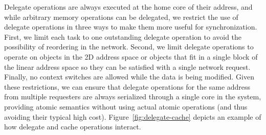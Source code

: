 Delegate operations are always executed at the home core of their
address, and while arbitrary memory operations can be delegated, we
restrict the use of delegate operations in three ways to make them more
useful for synchronization. First, we limit each task to one outstanding
delegate operation to avoid the possibility of reordering in the
network. Second, we limit delegate operations to operate on objects in
the 2D address space or objects that fit in a single block of the linear
address space so they can be satisfied with a single network request.
Finally, no context switches are allowed while the data is being
modified. Given these restrictions, we can ensure that delegate
operations for the same address from multiple requesters are always
serialized through a single core in the system, providing atomic
semantics without using actual atomic operations (and thus avoiding their typical high cost). 
Figure~\ref{fig:delegate-cache} depicts an example of how delegate and
cache operations interact.

